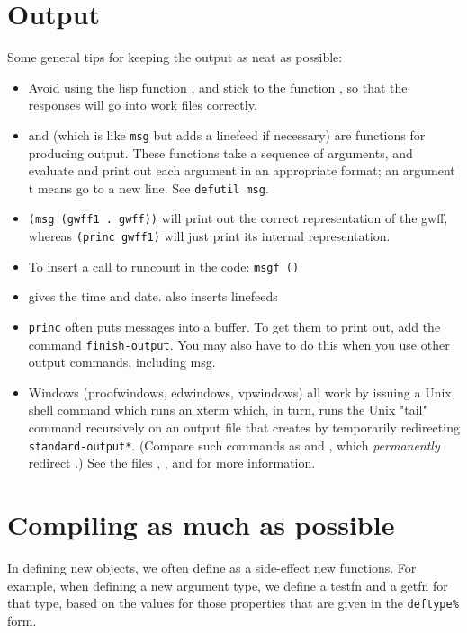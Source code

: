 \section{Output}

Some general tips for keeping the output as neat as possible:

\begin{itemize}
\item Avoid using the lisp function , and stick to the \TPS
function , so that the responses will go into work files
correctly.

\item {} and  (which is like {\tt msg} but adds a linefeed if necessary)
are \TPS functions for producing output. These functions take a sequence
of arguments, and evaluate and print out each argument in an appropriate format;
an argument t means go to a new line. See {\tt defutil msg}.

\item {\tt (msg (gwff1 . gwff))} will print out the correct representation
of the gwff, whereas {\tt (princ gwff1)} will just print its internal
representation.

\item To insert a call to runcount in the code:
{\tt msgf ()}

\item {} gives the time and date.  also inserts linefeeds

\item {\tt princ} often puts messages into a buffer.
To get them to print out, add the command {\tt {finish-output}}.
You may also have to do this when you use other
output commands, including msg. 

\item Windows (proofwindows, edwindows, vpwindows) all work by issuing a Unix shell
command which runs an xterm which, in turn, runs the Unix "tail" command 
recursively on an output file that \TPS creates by temporarily redirecting 
{\tt *standard-output*}. (Compare such commands as  and
, which {\it permanently} redirect {\tt {}}.)
See the files 
, ,  and
 for more information.
\end{itemize}

\section{Compiling as much as possible}
In defining new \TPS objects, we often define as a side-effect new functions.
For example, when defining a new argument type, we define a testfn and a
getfn for that type, based on the values for those properties that are
given in the {\tt deftype\%} form. 

